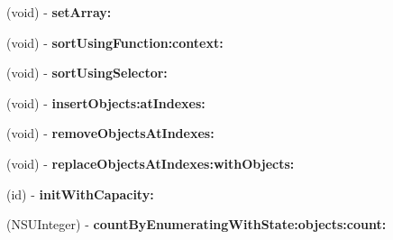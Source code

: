 \begin{DoxyCompactItemize}
\item 
\hypertarget{interfaceget_prescriptions_for_patient_response_a52ce5e775d549202b890ac80cf125f77}{}(void) -\/ {\bfseries set\+Array\+:}\label{interfaceget_prescriptions_for_patient_response_a52ce5e775d549202b890ac80cf125f77}

\item 
\hypertarget{interfaceget_prescriptions_for_patient_response_a1386d773ccd7e138e7da99336eff13e6}{}(void) -\/ {\bfseries sort\+Using\+Function\+:context\+:}\label{interfaceget_prescriptions_for_patient_response_a1386d773ccd7e138e7da99336eff13e6}

\item 
\hypertarget{interfaceget_prescriptions_for_patient_response_aef37e51dd011eb85922a737f2b7cfa77}{}(void) -\/ {\bfseries sort\+Using\+Selector\+:}\label{interfaceget_prescriptions_for_patient_response_aef37e51dd011eb85922a737f2b7cfa77}

\item 
\hypertarget{interfaceget_prescriptions_for_patient_response_ad1ea50313f8a2d2f6ce2a141e51c9508}{}(void) -\/ {\bfseries insert\+Objects\+:at\+Indexes\+:}\label{interfaceget_prescriptions_for_patient_response_ad1ea50313f8a2d2f6ce2a141e51c9508}

\item 
\hypertarget{interfaceget_prescriptions_for_patient_response_a5c76ef8fd8db27a3630316a607749d3b}{}(void) -\/ {\bfseries remove\+Objects\+At\+Indexes\+:}\label{interfaceget_prescriptions_for_patient_response_a5c76ef8fd8db27a3630316a607749d3b}

\item 
\hypertarget{interfaceget_prescriptions_for_patient_response_a46e4b40f8d45c957a138526719f02d64}{}(void) -\/ {\bfseries replace\+Objects\+At\+Indexes\+:with\+Objects\+:}\label{interfaceget_prescriptions_for_patient_response_a46e4b40f8d45c957a138526719f02d64}

\item 
\hypertarget{interfaceget_prescriptions_for_patient_response_ab4d3d31dcb4151645b66327d9bfa5862}{}(id) -\/ {\bfseries init\+With\+Capacity\+:}\label{interfaceget_prescriptions_for_patient_response_ab4d3d31dcb4151645b66327d9bfa5862}

\item 
\hypertarget{interfaceget_prescriptions_for_patient_response_ab141052f5f823164f0c94374016f6715}{}(N\+S\+U\+Integer) -\/ {\bfseries count\+By\+Enumerating\+With\+State\+:objects\+:count\+:}\label{interfaceget_prescriptions_for_patient_response_ab141052f5f823164f0c94374016f6715}


\end{DoxyCompactItemize}

